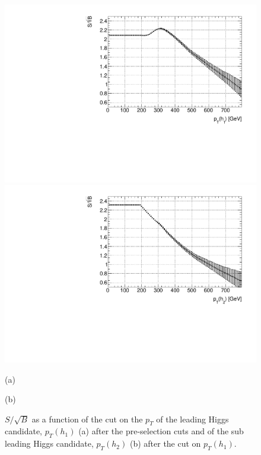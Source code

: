 \begin{figure}
	\centering
	\begin{minipage}{.5\textwidth}
		\centering
		\includegraphics[trim={.6cm 0 0 0},clip,width=\linewidth]{./Figures/SSB_h1_pt.pdf}
	\end{minipage}%
	\begin{minipage}{.5\textwidth}
		\centering
		\includegraphics[trim={0 0 .6cm 0},clip,width=\linewidth]{./Figures/SSB_h2_pt.pdf}
	\end{minipage}
	\begin{minipage}[t]{0.5\textwidth}
		\caption*{(a)}
	\end{minipage}%
	\hfill
	\begin{minipage}[t]{0.5\textwidth}
		\caption*{(b)}
	\end{minipage}
	\caption{$S/\sqrt{B}$ as a function of the cut on the $p_T$ of the leading Higgs candidate, $p_T(h_1)$ (a) after the pre-selection cuts and of the sub leading Higgs candidate, $p_T(h_2)$ (b) after the cut on $p_T(h_1)$.}
	\label{fig:SSB_h1h2_pt}
\end{figure} 

